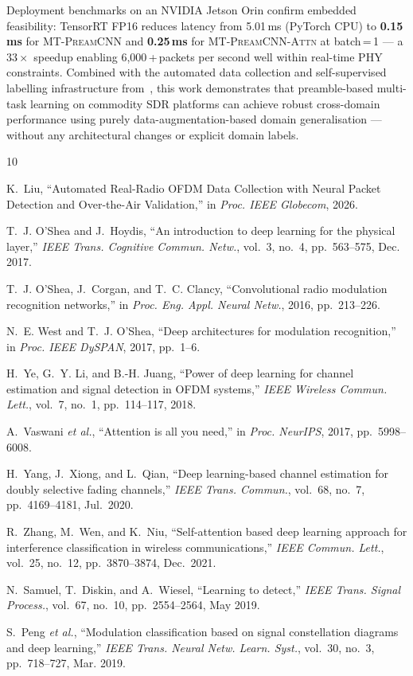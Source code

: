 \documentclass[conference]{IEEEtran}
\newcommand{\mtcnn}{\textsc{MT-PreamCNN}}
\newcommand{\mtcnnattn}{\textsc{MT-PreamCNN-Attn}}
\begin{document}
Deployment benchmarks on an NVIDIA Jetson Orin confirm embedded
feasibility: TensorRT FP16 reduces latency from 5.01\,ms (PyTorch CPU)
to \textbf{0.15\,ms} for \mtcnn{} and \textbf{0.25\,ms} for
\mtcnnattn{} at batch\,=\,1 — a $33\times$ speedup enabling
6{,}000\,+\,packets per second well within real-time PHY constraints.
Combined with the automated data collection and self-supervised
labelling infrastructure from~\cite{liu2026aisensing}, this work
demonstrates that preamble-based multi-task learning on commodity SDR
platforms can achieve robust cross-domain performance using purely
data-augmentation-based domain generalisation — without any
architectural changes or explicit domain labels.

\begin{thebibliography}{10}

K.~Liu,
``Automated Real-Radio OFDM Data Collection with Neural Packet Detection
and Over-the-Air Validation,''
in \emph{Proc. IEEE Globecom}, 2026.

T.~J. O'Shea and J.~Hoydis,
``An introduction to deep learning for the physical layer,''
\emph{IEEE Trans. Cognitive Commun. Netw.}, vol.~3, no.~4,
pp.~563--575, Dec. 2017.

T.~J. O'Shea, J.~Corgan, and T.~C. Clancy,
``Convolutional radio modulation recognition networks,''
in \emph{Proc. Eng. Appl. Neural Netw.}, 2016, pp.~213--226.

N.~E. West and T.~J. O'Shea,
``Deep architectures for modulation recognition,''
in \emph{Proc. IEEE DySPAN}, 2017, pp.~1--6.

H.~Ye, G.~Y. Li, and B.-H. Juang,
``Power of deep learning for channel estimation and signal detection in
OFDM systems,''
\emph{IEEE Wireless Commun. Lett.}, vol.~7, no.~1, pp.~114--117, 2018.

A.~Vaswani \textit{et al.},
``Attention is all you need,''
in \emph{Proc. NeurIPS}, 2017, pp.~5998--6008.

H.~Yang, J.~Xiong, and L.~Qian,
``Deep learning-based channel estimation for doubly selective fading
channels,''
\emph{IEEE Trans. Commun.}, vol.~68, no.~7, pp.~4169--4181, Jul.~2020.

R.~Zhang, M.~Wen, and K.~Niu,
``Self-attention based deep learning approach for interference
classification in wireless communications,''
\emph{IEEE Commun. Lett.}, vol.~25, no.~12, pp.~3870--3874, Dec.~2021.

N.~Samuel, T.~Diskin, and A.~Wiesel,
``Learning to detect,''
\emph{IEEE Trans. Signal Process.}, vol.~67, no.~10,
pp.~2554--2564, May 2019.

S.~Peng \textit{et al.},
``Modulation classification based on signal constellation diagrams and
deep learning,''
\emph{IEEE Trans. Neural Netw. Learn. Syst.}, vol.~30, no.~3,
pp.~718--727, Mar. 2019.

\end{thebibliography}
\end{document}
